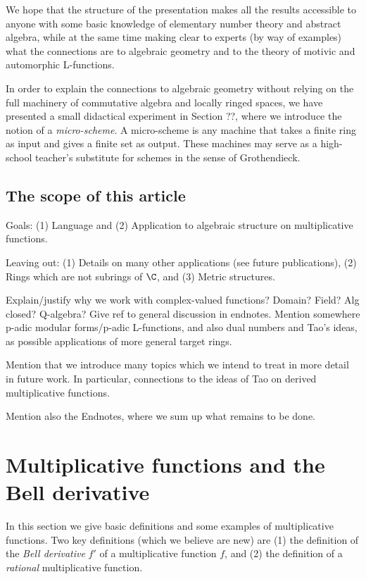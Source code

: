 \documentclass[a4paper]{article}
\begin{document}
We hope that the structure of the presentation makes all the results accessible to anyone with some basic knowledge of elementary number theory and abstract algebra, while at the same time making clear to experts (by way of examples) what the connections are to algebraic geometry and to the theory of motivic and automorphic L-functions. 

In order to explain the connections to algebraic geometry without relying on the full machinery of commutative algebra and locally ringed spaces, we have presented a small didactical experiment in Section ??, where we introduce the notion of a \emph{micro-scheme}. A micro-scheme is any machine that takes a finite ring as input and gives a finite set as output. These machines may serve as a high-school teacher's substitute for schemes in the sense of Grothendieck.

\subsection{The scope of this article}

Goals: (1) Language and (2) Application to algebraic structure on multiplicative functions.

Leaving out: (1) Details on many other applications (see future publications), (2) Rings which are not subrings of $\C$, and (3) Metric structures.

Explain/justify why we work with complex-valued functions? Domain? Field? Alg closed? Q-algebra? Give ref to general discussion in endnotes. Mention somewhere p-adic modular forms/p-adic L-functions, and also dual numbers and Tao's ideas, as possible applications of more general target rings.

Mention that we introduce many topics which we intend to treat in more detail in future work. In particular, connections to the ideas of Tao on derived multiplicative functions.

Mention also the Endnotes, where we sum up what remains to be done.



\section{Multiplicative functions and the Bell derivative}

In this section we give basic definitions and some examples of multiplicative functions. Two key definitions (which we believe are new) are (1) the definition of the \emph{Bell derivative} $f'$ of a multiplicative function $f$, and (2) the definition of  a \emph{rational} multiplicative function.
\end{document}
